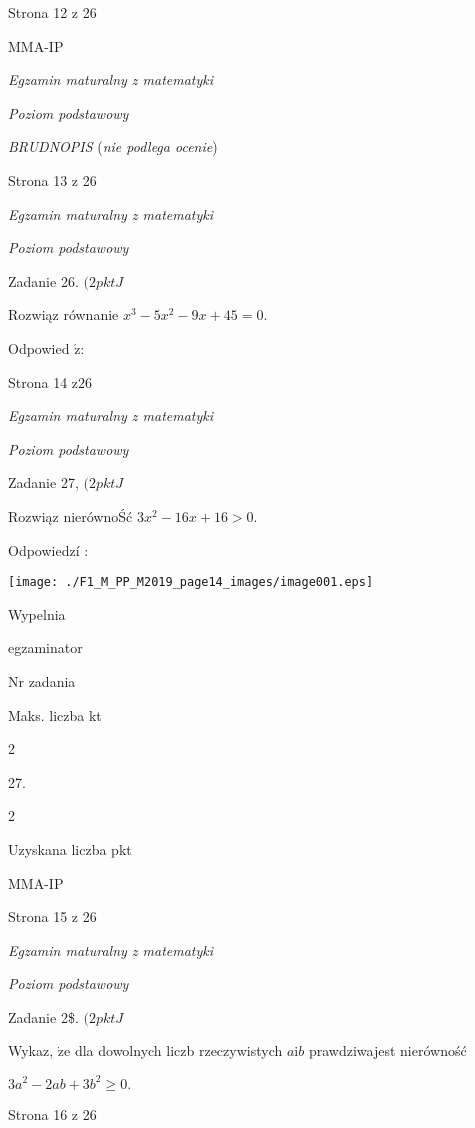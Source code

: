 \documentclass[a4paper,12pt]{article}
\begin{document}
Strona 12 z 26

MMA-IP





{\it Egzamin maturalny z matematyki}

{\it Poziom podstawowy}

{\it BRUDNOPIS} ({\it nie podlega ocenie})

Strona 13 z 26





{\it Egzamin maturalny z matematyki}

{\it Poziom podstawowy}

Zadanie 26. $(2pktJ$

Rozwiąz równanie $x^{3}-5x^{2}-9x+45=0.$

Odpowied $\acute{\mathrm{z}}$:

Strona 14 $\mathrm{z}26$





{\it Egzamin maturalny z matematyki}

{\it Poziom podstawowy}

Zadanie 27, $(2pktJ$

Rozwiąz nierównoŚć $3x^{2}-16x+16>0.$

Odpowiedzí :
\begin{center}
\texttt{[image: ./F1\_M\_PP\_M2019\_page14\_images/image001.eps]}
\end{center}
Wypelnia

egzaminator

Nr zadania

Maks. liczba kt

2

27.

2

Uzyskana liczba pkt

MMA-IP

Strona 15 z 26





{\it Egzamin maturalny z matematyki}

{\it Poziom podstawowy}

Zadanie 2{\$}. $(2pktJ$

Wykaz, $\dot{\mathrm{z}}\mathrm{e}$ dla dowolnych liczb rzeczywistych $a\mathrm{i}b$ prawdziwajest nierówność

$3a^{2}-2ab+3b^{2}\geq 0.$

Strona 16 z 26
\end{document}
